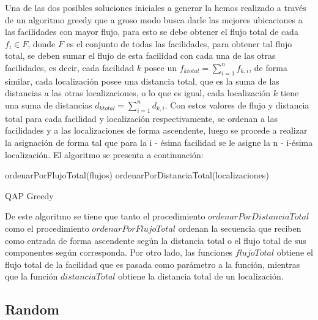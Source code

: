 \documentclass{ci5652}
\begin{document}
Una de las dos posibles soluciones iniciales a generar la hemos realizado a través de un algoritmo greedy que a groso modo busca darle las mejores ubicaciones a las facilidades con mayor flujo, para esto se debe obtener el flujo total de cada \(f_{i}\in F\), donde \(F\) es el conjunto de todas las facilidades, para obtener tal flujo total, se deben sumar el flujo de esta facilidad con cada una de las otras facilidades, es decir, cada facilidad \(k\) posee un \(f_{k total} = \sum_{i=1}^{n}f_{k,i}\), de forma similar, cada localización posee una distancia total, que es la suma de las distancias a las otras localizaciones, o lo que es igual, cada localización \(k\) tiene una suma de distancias \(d_{k total} = \sum_{i=1}^{n}d_{k,i}\). Con estos valores de flujo y distancia total para cada facilidad y localización respectivamente, se ordenan a las facilidades y a las localizaciones de forma ascendente, luego se procede a realizar la asignación de forma tal que para la i - ésima facilidad se le asigne la n - i-ésima localización. El algoritmo se presenta a continuación:

\begin{algorithm}
 \DontPrintSemicolon
 \vspace*{0.1cm}
 ordenarPorFlujoTotal(flujos)\;
 ordenarPorDistanciaTotal(localizaciones)\;
 
 
 \vspace*{0.1cm}
 \caption{QAP Greedy}
\end{algorithm}
    

De este algoritmo se tiene que tanto el procedimiento \(ordenarPorDistanciaTotal\) como el procedimiento \(ordenarPorFlujoTotal\) ordenan la secuencia que reciben como entrada de forma ascendente según la distancia total o el flujo total de sus componentes según corresponda. Por otro lado, las funciones \(flujoTotal\) obtiene el flujo total de la facilidad que es pasada como parámetro a la función, mientras que la función \(distanciaTotal\) obtiene la distancia total de un localización.



\subsection{Random}
\end{document}
